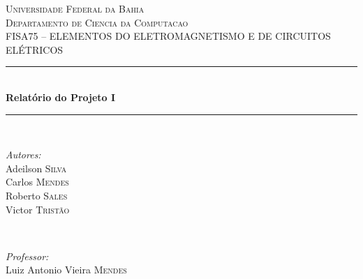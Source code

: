 \begin{titlepage}

\newcommand{\HRule}{\rule{\linewidth}{0.5mm}} %

\center %

  
  \textsc{\LARGE Universidade Federal da Bahia}\\[1.5cm] %
\textsc{\Large Departamento de Ciencia da Computacao}\\[0.5cm] %
\textsc{\large FISA75 – ELEMENTOS DO ELETROMAGNETISMO E DE CIRCUITOS
ELÉTRICOS}\\[0.5cm] %

  
  \HRule \\[0.4cm]
{ \huge \bfseries Relatório do Projeto I}\\[0.4cm] %
\HRule \\[1.5cm]

  
  \begin{minipage}{0.4\textwidth}
\begin{flushleft} \large
\emph{Autores:}\\
Adeilson \textsc{Silva}\\ %
Carlos \textsc{Mendes}\\ %
Roberto \textsc{Sales}\\ %
Victor \textsc{Tristão}\\ %

\end{flushleft}
\end{minipage}
~
  \begin{minipage}{0.4\textwidth}
\begin{flushright} \large
\emph{Professor:} \\
Luiz Antonio Vieira \textsc{Mendes} %
\end{flushright}
\end{minipage}\\[2cm]


\end{titlepage}
